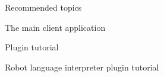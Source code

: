 






Recommended topics

The main client application

Plugin tutorial

Robot language interpreter plugin tutorial


